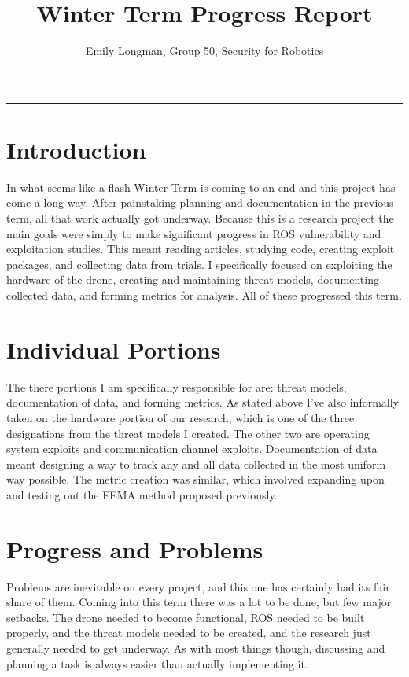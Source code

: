 \documentclass[IEEEtran,letterpaper,12pt,notitlepage,draftclsnofoot,onecolumn]{article}
\author{Emily Longman, Group 50, Security for Robotics}
\title{Winter Term Progress Report}
\begin{document}
\maketitle
\hrule\vspace{1cm}

\section*{Introduction}
In what seems like a flash Winter Term is coming to an end and this project has come a long way.
After painstaking planning and documentation in the previous term, all that work actually got underway.
Because this is a research project the main goals were simply to make significant progress in ROS vulnerability and exploitation studies.
This meant reading articles, studying code, creating exploit packages, and collecting data from trials.
I specifically focused on exploiting the hardware of the drone, creating and maintaining threat models, documenting collected data, and forming metrics for analysis.
All of these progressed this term.

\section*{Individual Portions}
The there portions I am specifically responsible for are: threat models, documentation of data, and forming metrics.
As stated above I've also informally taken on the hardware portion of our research, which is one of the three designations from the threat models I created.
The other two are operating system exploits and communication channel exploits.
Documentation of data meant designing a way to track any and all data collected in the most uniform way possible.
The metric creation was similar, which involved expanding upon and testing out the FEMA method proposed previously. 

\section*{Progress and Problems}
Problems are inevitable on every project, and this one has certainly had its fair share of them.
Coming into this term there was a lot to be done, but few major setbacks.
The drone needed to become functional, ROS needed to be built properly, and the threat models needed to be created, and the research just generally needed to get underway.
As with most things though, discussing and planning a task is always easier than actually implementing it.
\end{document}
